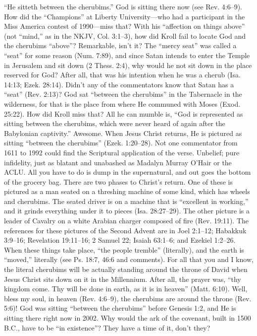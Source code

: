 {“He sitteth between the cherubims.” God is
sitting there now (see Rev. 4:6–9). How did
the “Champions” at Liberty University—who
had a participant in the Miss America contest
of 1990—miss that? With his “affection on
things above” (not “mind,” as in the NKJV,
Col. 3:1--3), how did Kroll fail to locate God
and the cherubims “above”? Remarkable,
isn’t it? The “mercy seat” was called a
“seat” for some reason (Num. 7:89), and
since Satan intends to enter the Temple in
Jerusalem and sit down (2 Thess. 2:4), why
would he not sit down in the place reserved
for God? After all, that was his intention
when he was a cherub (Isa. 14:13; Ezek.
28:14).
Didn’t any of the commentators know that
Satan has a “seat” (Rev. 2:13)? God sat
“between the cherubims” in the Tabernacle
in the wilderness, for that is the place from
where He communed with Moses (Exod.
25:22). How did Kroll miss that? All he can
mumble is, “God is represented as sitting
between the cherubims, which were never
heard of again after the Babylonian captivity.”
Awesome.
When Jesus Christ returns, He is pictured as
sitting “between the cherubims” (Ezek.
1:20–28).
Not one commentator from 1611 to 1992
could find the Scriptural application of the
verse. Unbelief; pure infidelity, just as blatant
and unabashed as Madalyn Murray O’Hair or
the ACLU. All you have to do is dump in the
supernatural, and out goes the bottom of the
grocery bag.
There are two phases to Christ’s return. One
of these is pictured as a man seated on a
threshing machine of some kind, which has
wheels and cherubims. The seated driver is on
a machine that is “excellent in working,” and
it grinds everything under it to pieces (Isa.
28:27–29). The other picture is a leader of
Cavalry on a white Arabian charger
composed of fire (Rev. 19:11). The
references for these pictures of the Second
Advent are in Joel 2:1–12; Habakkuk 3:9–16;
Revelation 19:11–16; 2 Samuel 22; Isaiah
63:1–6; and Ezekiel 1:2–26. When these
things take place, “the people tremble”
(literally), and the earth is “moved,” literally
(see Ps. 18:7, 46:6 and comments). For all
that you and I know, the literal cherubims will
be actually standing around the throne of
David when Jesus Christ sits down on it in
the Millennium. After all, the prayer was,
“thy kingdom come. Thy will be done in
earth, as it is in heaven” (Matt. 6:10). Well,
bless my soul, in heaven (Rev. 4:6–9), the
cherubims are around the throne (Rev. 5:6)!
God was
sitting “between the cherubims” before
Genesis 1:2, and He is sitting there right now
in 2002. Why would the ark of the covenant,
built in 1500 B.C., have to be “in existence”?
They have a time of it, don’t they?}
